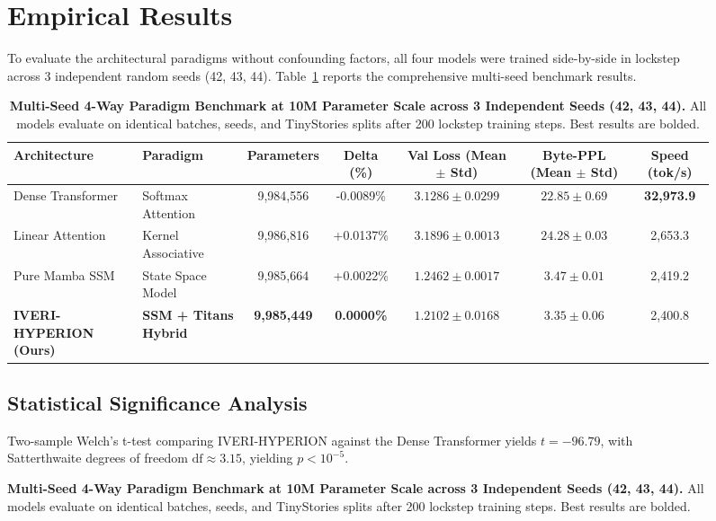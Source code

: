 \documentclass[10pt,twocolumn,letterpaper]{article}
\begin{document}
\begin{figure}[t]
\section{Empirical Results}
\label{sec:results}

To evaluate the architectural paradigms without confounding factors, all four models were trained side-by-side in lockstep across 3 independent random seeds (42, 43, 44). Table~\ref{tab:main_results} reports the comprehensive multi-seed benchmark results.

\begin{table}[t]
\centering
\small
\caption{\textbf{Multi-Seed 4-Way Paradigm Benchmark at 10M Parameter Scale across 3 Independent Seeds (42, 43, 44).} All models evaluate on identical batches, seeds, and TinyStories splits after 200 lockstep training steps. Best results are bolded.}
\label{tab:main_results}
\begin{tabular}{llccccc}
\toprule
\textbf{Architecture} & \textbf{Paradigm} & \textbf{Parameters} & \textbf{Delta (\%)} & \textbf{Val Loss (Mean $\pm$ Std)} & \textbf{Byte-PPL (Mean $\pm$ Std)} & \textbf{Speed (tok/s)} \\
\midrule
Dense Transformer~\cite{vaswani2017attention} & Softmax Attention & 9,984,556 & -0.0089\% & $3.1286 \pm 0.0299$ & $22.85 \pm 0.69$ & \textbf{32,973.9} \\
Linear Attention~\cite{katharopoulos2020transformers} & Kernel Associative & 9,986,816 & +0.0137\% & $3.1896 \pm 0.0013$ & $24.28 \pm 0.03$ & 2,653.3 \\
Pure Mamba SSM~\cite{gu2023mamba} & State Space Model & 9,985,664 & +0.0022\% & $1.2462 \pm 0.0017$ & $3.47 \pm 0.01$ & 2,419.2 \\
\textbf{IVERI-HYPERION (Ours)} & \textbf{SSM + Titans Hybrid} & \textbf{9,985,449} & \textbf{0.0000\%} & $\mathbf{1.2102 \pm 0.0168}$ & $\mathbf{3.35 \pm 0.06}$ & 2,400.8 \\
\bottomrule
\end{tabular}
\end{table}

\subsection{Statistical Significance Analysis}
Two-sample Welch's t-test comparing IVERI-HYPERION against the Dense Transformer yields $t = -96.79$, with Satterthwaite degrees of freedom $\text{df} \approx 3.15$, yielding $p < 10^{-5}$. 


\end{figure}
\end{document}
